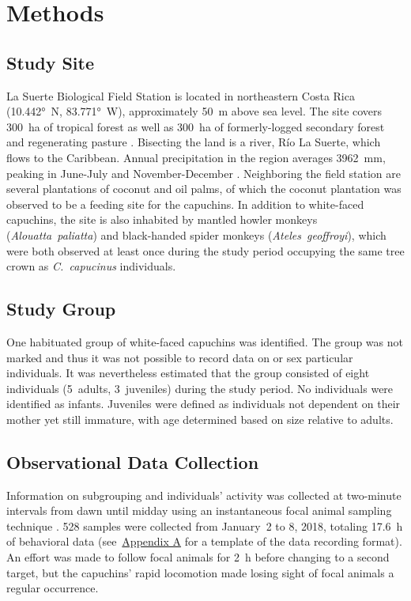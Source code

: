 \documentclass{../../../coursework}
\begin{document}
\section{Methods}

\subsection{Study Site}

La Suerte Biological Field Station is located in northeastern Costa Rica
(10.442°~N, 83.771°~W), approximately \SI{50}{\metre} above sea level. The
site covers 300~ha of tropical forest as well as \SI{300}{\hectare} of
formerly-logged secondary forest and regenerating pasture
\parencite{Mallott2017}. Bisecting the land is a river, Río La Suerte, which
flows to the Caribbean. Annual precipitation in the region averages
\SI{3962}{\milli\metre}, peaking in June-July and November-December
\parencite{Sanford1994}. Neighboring the field station are several plantations
of coconut and oil palms, of which the coconut plantation was observed to be a
feeding site for the capuchins. In addition to white-faced capuchins, the site
is also inhabited by mantled howler monkeys (\emph{Alouatta~paliatta}) and
black-handed spider monkeys (\emph{Ateles~geoffroyi}), which were both
observed at least once during the study period occupying the same tree crown
as \emph{C.~capucinus} individuals.

\subsection{Study Group}

One habituated group of white-faced capuchins was identified. The group was
not marked and thus it was not possible to record data on or sex particular
individuals. It was nevertheless estimated that the group consisted of eight
individuals (5~adults, 3~juveniles) during the study period. No individuals
were identified as infants. Juveniles were defined as individuals not
dependent on their mother yet still immature, with age determined based on
size relative to adults.

\subsection{Observational Data Collection}

Information on subgrouping and individuals' activity was collected at
two-minute intervals from dawn until midday using an instantaneous focal
animal sampling technique \parencite{Altmann1974}. 528 samples were collected
from January~2 to 8, 2018, totaling \SI{17.6}{\hour} of behavioral data
(see~\hyperref[sec:appendix_a]{Appendix A} for a template of the data
recording format). An effort was made to follow focal animals for
\SI{2}{\hour} before changing to a second target, but the capuchins' rapid
locomotion made losing sight of focal animals a regular occurrence.
\end{document}
